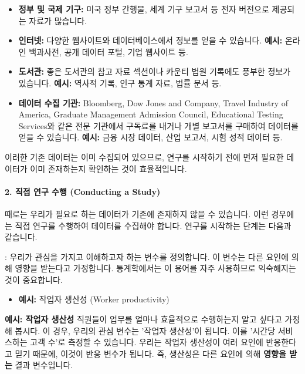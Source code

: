 \documentclass[11pt,a4paper]{article}
\theoremstyle{definition}
\begin{document}
\begin{itemize}
    \item \textbf{정부 및 국제 기구:} 미국 정부 간행물, 세계 기구 보고서 등 전자 버전으로 제공되는 자료가 많습니다.
    \item \textbf{인터넷:} 다양한 웹사이트와 데이터베이스에서 정보를 얻을 수 있습니다.
    \textbf{예시:} 온라인 백과사전, 공개 데이터 포털, 기업 웹사이트 등.
    \item \textbf{도서관:} 좋은 도서관의 참고 자료 섹션이나 카운티 법원 기록에도 풍부한 정보가 있습니다.
    \textbf{예시:} 역사적 기록, 인구 통계 자료, 법률 문서 등.
    \item \textbf{데이터 수집 기관:} Bloomberg, Dow Jones and Company, Travel Industry of America, Graduate Management Admission Council, Educational Testing Services와 같은 전문 기관에서 구독료를 내거나 개별 보고서를 구매하여 데이터를 얻을 수 있습니다.
    \textbf{예시:} 금융 시장 데이터, 산업 보고서, 시험 성적 데이터 등.
\end{itemize}
이러한 기존 데이터는 이미 수집되어 있으므로, 연구를 시작하기 전에 먼저 필요한 데이터가 이미 존재하는지 확인하는 것이 효율적입니다.

\paragraph{2. 직접 연구 수행 (Conducting a Study)}
때로는 우리가 필요로 하는 데이터가 기존에 존재하지 않을 수 있습니다. 이런 경우에는 직접 연구를 수행하여 데이터를 수집해야 합니다. 연구를 시작하는 단계는 다음과 같습니다.

\begin{tcolorbox}[infobox, title={연구 시작의 첫 번째 단계: 반응 변수 정의 (Step One in Initiating a Study)}]
: 우리가 관심을 가지고 이해하고자 하는 변수를 정의합니다. 이 변수는 다른 요인에 의해 영향을 받는다고 가정합니다. 통계학에서는 이 용어를 자주 사용하므로 익숙해지는 것이 중요합니다.
\begin{itemize}
    \item \textbf{예시:} 작업자 생산성 (Worker productivity)
\end{itemize}
\end{tcolorbox}

\begin{examplebox}
\textbf{예시: 작업자 생산성}
직원들이 업무를 얼마나 효율적으로 수행하는지 알고 싶다고 가정해 봅시다. 이 경우, 우리의 관심 변수는 '작업자 생산성'이 됩니다. 이를 '시간당 서비스하는 고객 수'로 측정할 수 있습니다. 우리는 작업자 생산성이 여러 요인에 반응한다고 믿기 때문에, 이것이 반응 변수가 됩니다. 즉, 생산성은 다른 요인에 의해 \textbf{영향을 받는} 결과 변수입니다.
\end{examplebox}
\end{document}
